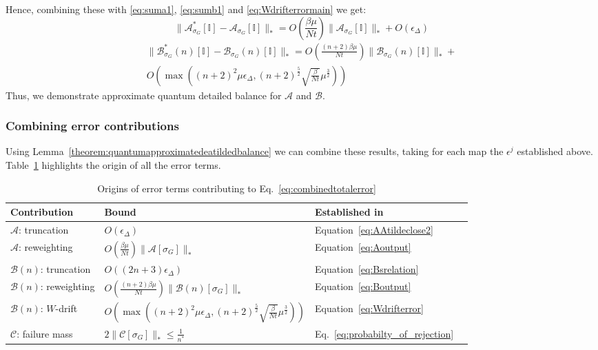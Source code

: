 \documentclass[aps,floatfix,10pt,amssymb,amsfont,amsmath,superscriptaddress,float,nofootinbib,longbibliography,nobalancelastpage,twocolumn]{revtex4-2}
\begin{document}
Hence, combining these with \eqref{eq:suma1}, \eqref{eq:sumb1} and \eqref{eq:Wdrifterrormain} we get:
\begin{equation}
    \|\mathcal{A}^*_{\sigma_G}[\mathbb{I}] - \mathcal{A}_{\sigma_G}[\mathbb{I}]\|_* = O\!\left(\frac{\beta\mu}{Nt}\right)\|\mathcal{A}_{\sigma_G}[\mathbb{I}]\|_* + O\!\left(\epsilon_{\Delta}\right)
\end{equation}
\begin{multline}
    \|\mathcal{B}^*_{\sigma_G}(n)[\mathbb{I}] - \mathcal{B}_{\sigma_G}(n)[\mathbb{I}]\|_* = O\left(\frac{(n+2)\beta\mu}{Nt} \right)\|\mathcal{B}_{\sigma_G}(n)[\mathbb{I}]\|_* +\\O\left(\max\left((n+2)^2\mu\epsilon_{\Delta},(n+2)^{\frac{5}{2}}\sqrt{\frac{\beta }{Nt}}\mu^{\frac{3}{2}}\right)\right) 
\end{multline}
Thus, we demonstrate approximate quantum detailed balance for $\mathcal{A}$ and $\mathcal{B}$.
\subsubsection{Combining error contributions}
\label{sec:combine}
Using Lemma~\ref{theorem:quantumapproximatedeatildedbalance} we can combine these results, taking for each map the $\epsilon^j$ established above. Table~\ref{tab:contributions} highlights the origin of all the error terms.
\begin{table}
\begin{tabular}{llll}
\hline\hline
Contribution & Bound & Established in \\
\hline
$\mathcal{A}$: truncation & $O(\epsilon_{\Delta})$ &
Equation~\eqref{eq:AAtildeclose2} \\
$\mathcal{A}$: reweighting &  $O(\frac{\beta\mu}{Nt})\|\mathcal{A}[\sigma_G]\|_*$ & Equation~\eqref{eq:Aoutput} \\
$\mathcal{B}(n)$: truncation  & $O((2n+3)\epsilon_{\Delta})$ & Equation~\eqref{eq:Bsrelation} \\
$\mathcal{B}(n)$: reweighting & $O(\frac{(n+2)\beta\mu}{Nt})\|\mathcal{B}(n)[\sigma_G]\|_*$ &  Equation~\eqref{eq:Boutput}\\
$\mathcal{B}(n)$: $W$-drift  & $O\left(\max\left((n+2)^2\mu\epsilon_{\Delta},(n+2)^{\frac{5}{2}}\sqrt{\frac{\beta }{Nt}}\mu^{\frac{3}{2}}\right)\right) $ & Equation~\eqref{eq:Wdrifterror}\\
$\mathcal{C}$: failure mass & $2\|\mathcal{C}[\sigma_G]\|_* \leq \frac{1}{n^*}$ &  Eq.~\eqref{eq:probabilty_of_rejection} \\
\hline\hline
\end{tabular}
\caption{\label{tab:contributions} Origins of error terms contributing to Eq.~\eqref{eq:combinedtotalerror}}
\end{table}
\end{document}
